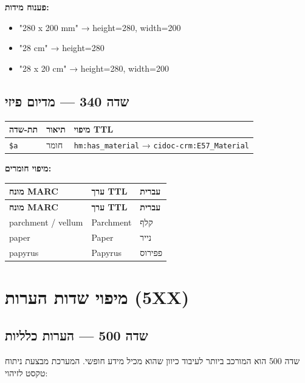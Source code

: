 \documentclass[12pt,a4paper]{article}
\newcommand{\marcfield}[1]{\texttt{#1}}
\newcommand{\ttlprop}[1]{\texttt{#1}}
\newcommand{\ttlclass}[1]{\texttt{#1}}
\begin{document}
\textbf{פענוח מידות:}

\begin{itemize}
\item "280 x 200 mm" → height=280, width=200
\item "28 cm" → height=280
\item "28 x 20 cm" → height=280, width=200
\end{itemize}

\subsection{שדה 340 — מדיום פיזי}

\begin{longtable}{|L{2.5cm}|p{4.5cm}|L{9cm}|}
\hline
\textbf{תת-שדה} & \textbf{תיאור} & \textbf{מיפוי TTL} \\
\hline
\marcfield{\$a} & חומר & \ttlprop{hm:has\_material} → \ttlclass{cidoc-crm:E57\_Material} \\
\hline
\end{longtable}

\textbf{מיפוי חומרים:}

\begin{longtable}{|p{4cm}|L{5cm}|L{7cm}|}
\hline
\textbf{מונח MARC} & \textbf{ערך TTL} & \textbf{עברית} \\
\hline
\endfirsthead
\hline
\textbf{מונח MARC} & \textbf{ערך TTL} & \textbf{עברית} \\
\hline
\endhead
\hline
\endfoot
parchment / vellum & Parchment & קלף \\
\hline
paper & Paper & נייר \\
\hline
papyrus & Papyrus & פפירוס \\
\hline
\end{longtable}

\newpage
\section{מיפוי שדות הערות \textenglish{(5XX)}}

\subsection{שדה 500 — הערות כלליות}

שדה 500 הוא המורכב ביותר לעיבוד כיוון שהוא מכיל מידע חופשי. המערכת מבצעת ניתוח טקסט לזיהוי:
\end{document}
